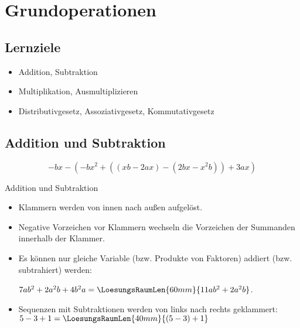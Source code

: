 \newpage
\section{Grundoperationen}
\renewcommand{\bbwAufgabenBlockID}{A1G}

\subsection*{Lernziele}
\begin{itemize}
\item Addition, Subtraktion
\item Multiplikation, Ausmultiplizieren
\item Distributivgesetz,
  Assoziativgesetz,
  Kommutativgesetz
\end{itemize}

\newpage

\subsection{Addition und Subtraktion}
\begin{beispiel}{}{}
$$-bx-(-bx^2+((xb-2ax)-(2bx-x^2b))+3ax)$$
\end{beispiel}


\begin{rezept}{Addition und Subtraktion}{}
\begin{itemize}
\item Klammern werden von innen nach außen aufgelöst.
\item Negative Vorzeichen vor Klammern wechseln die Vorzeichen der
      Summanden innerhalb der Klammer.
\item Es können nur gleiche Variable (bzw. Produkte von Faktoren)
      addiert (bzw. subtrahiert) werden:

      $7ab^2 +2a^2b+4b^2a = \LoesungsRaumLen{60mm}{11ab^2 + 2a^2b}$.
\item Sequenzen mit Subtraktionen werden von links
      nach rechts geklammert: $5-3+1 = \LoesungsRaumLen{40mm}{(5-3) + 1}$
\end{itemize}
\end{rezept}
 \newpage



